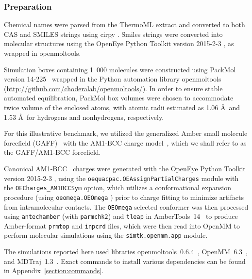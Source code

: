 \documentclass[aip, jcp, reprint]{revtex4-1}  %
\begin{document}
\subsubsection{Preparation}
\label{section:preparation}

Chemical names were parsed from the ThermoML extract and converted to both CAS and SMILES strings using cirpy \cite{swain2012cirpy}.  Smiles strings were converted into molecular structures using the OpenEye Python Toolkit version 2015-2-3 \cite{openeye}, as wrapped in openmoltools.  

Simulation boxes containing 1~000 molecules were constructed using PackMol version 14-225~\cite{martinez2009packmol, packmolurl} wrapped in the Python automation library openmoltools  (\url{http://github.com/choderalab/openmoltools/}).
In order to ensure stable automated equilibration, PackMol box volumes were chosen to accommodate twice volume of the enclosed atoms, with atomic radii estimated as 1.06 \AA\ and 1.53 \AA\ for hydrogens and nonhydrogens, respectively.  

For this illustrative benchmark, we utilized the generalized Amber small molecule forcefield (GAFF)~\cite{gaff,gaff2} with the AM1-BCC charge model~\cite{am1bcc1,am1bcc2}, which we shall refer to as the GAFF/AM1-BCC forcefield.

Canonical AM1-BCC~\cite{am1bcc1,am1bcc2, velez2014time} charges were generated with the OpenEye Python Toolkit version 2015-2-3 \cite{openeye}, using the {\tt oequacpac.OEAssignPartialCharges} module with the {\tt OECharges\_AM1BCCSym} option, which utilizes a conformational expansion procedure (using {\tt oeomega.OEOmega} \cite{hawkins2012conformer}) prior to charge fitting to minimize artifacts from intramolecular contacts.  
The {\tt OEOmega} selected conformer was then processed using {\tt antechamber} (with {\tt parmchk2}) and {\tt tleap} in AmberTools~14~\cite{amber14} to produce Amber-format {\tt prmtop} and {\tt inpcrd} files, which were then read into OpenMM to perform molecular simulations using the {\tt simtk.openmm.app} module.

The simulations reported here used libraries openmoltools~0.6.4~\cite{openmoltools}, OpenMM~6.3~\cite{eastman2012openmm}, and MDTraj~1.3~\cite{mcgibbon2014mdtraj}.  
Exact commands to install various dependencies can be found in Appendix~\ref{section:commands}.
\end{document}
